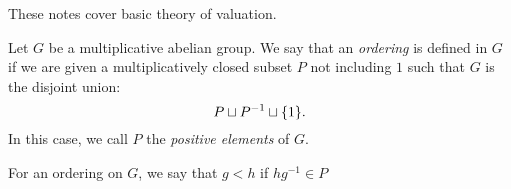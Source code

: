 These notes cover basic theory of valuation.

\begin{defn}
Let $G$ be a multiplicative abelian group. We say that an 
\emph{ordering} is defined in $G$ if we are given a 
multiplicatively closed subset $P$ not including $1$ such that 
$G$ is the disjoint union:
\[
P \sqcup P^{-1} \sqcup \{1\}.
\]
In this case, we call $P$ the \emph{positive elements} of $G$.
\end{defn}

For an ordering on $G$, we say that $g < h$ if $hg^{-1} \in P$
